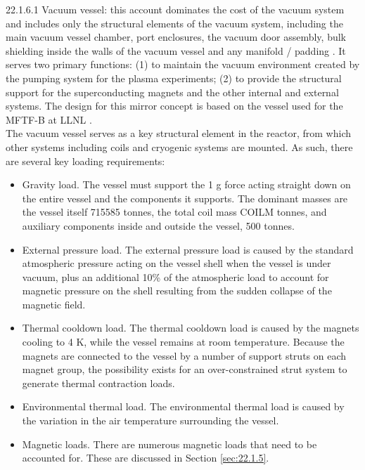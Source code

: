22.1.6.1 Vacuum vessel: this account dominates the cost of the vacuum system and includes only the structural elements of the vacuum system, including the main vacuum vessel chamber, port enclosures, the vacuum door assembly, bulk shielding inside the walls of the vacuum vessel and any manifold / padding \cite{waganer2006design}. It serves two primary functions: (1) to maintain the vacuum environment created by the pumping system for the plasma experiments; (2) to provide the structural support for the superconducting magnets and the other internal and external systems. The design for this mirror concept is based on the vessel used for the MFTF-B at LLNL \cite{gerich1986design}. \\

The vacuum vessel serves as a  key structural element in the reactor, from which other systems including coils and cryogenic systems are mounted.  As such, there are several key loading requirements:

\begin{itemize}
    \item Gravity load. The vessel must support the 1 g force acting straight down on the entire vessel and the components it supports. The dominant masses are the vessel itself 715585 tonnes, the total coil mass COILM tonnes, and auxiliary components inside and outside the vessel, 500 tonnes.

    \item External pressure load. The external pressure load is caused by the standard atmospheric pressure acting on the vessel shell when the vessel is under vacuum, plus an additional 10\% of the atmospheric load to account for magnetic  pressure on the shell resulting from the sudden collapse of the magnetic field. 

    \item Thermal cooldown load. The thermal cooldown load is  caused by the magnets cooling to 4 K, while the vessel remains at room temperature. Because the magnets are connected to the vessel by a number of support struts on each  magnet group, the possibility exists for an over-constrained  strut system to generate thermal contraction loads.

    \item Environmental thermal load. The environmental thermal load is caused by the variation in the air temperature surrounding the vessel.

    \item Magnetic loads. There are numerous magnetic loads that need to be accounted for. These are discussed in Section \ref{sec:22.1.5}.
\end{itemize}

